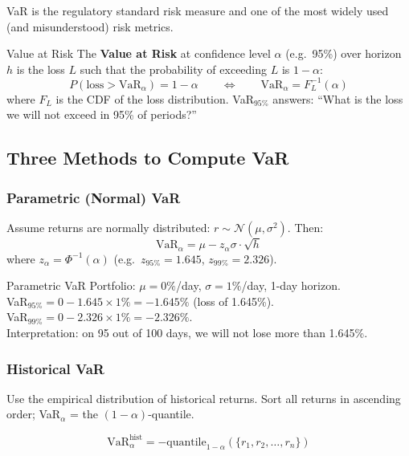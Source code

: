 \documentclass[12pt,a4paper,openany]{report}
\theoremstyle{definition}
\begin{document}
VaR is the regulatory standard risk measure and one of the most widely used (and misunderstood) risk metrics.

\begin{definitionbox}{Value at Risk}
The \textbf{Value at Risk} at confidence level $\alpha$ (e.g.\ 95\%) over horizon $h$ is the loss $L$ such that the probability of exceeding $L$ is $1-\alpha$:
\[
  P(\text{loss} > \text{VaR}_\alpha) = 1 - \alpha \qquad \Longleftrightarrow \qquad \text{VaR}_\alpha = F_L^{-1}(\alpha)
\]
where $F_L$ is the CDF of the loss distribution. VaR$_{95\%}$ answers: ``What is the loss we will not exceed in 95\% of periods?''
\end{definitionbox}

\subsection{Three Methods to Compute VaR}

\subsubsection{Parametric (Normal) VaR}

Assume returns are normally distributed: $r \sim \mathcal{N}(\mu, \sigma^2)$. Then:
\begin{equation}
  \text{VaR}_\alpha = \mu - z_\alpha \sigma \cdot \sqrt{h}
\end{equation}
where $z_\alpha = \Phi^{-1}(\alpha)$ (e.g.\ $z_{95\%} = 1.645$, $z_{99\%} = 2.326$).

\begin{examplebox}{Parametric VaR}
Portfolio: $\mu = 0\%$/day, $\sigma = 1\%$/day, 1-day horizon. \\
VaR$_{95\%} = 0 - 1.645 \times 1\% = -1.645\%$ (loss of 1.645\%). \\
VaR$_{99\%} = 0 - 2.326 \times 1\% = -2.326\%$. \\
Interpretation: on 95 out of 100 days, we will not lose more than 1.645\%.
\end{examplebox}

\subsubsection{Historical VaR}

Use the empirical distribution of historical returns. Sort all returns in ascending order; VaR$_\alpha$ = the $(1-\alpha)$-quantile.

\[
  \text{VaR}_\alpha^{\text{hist}} = -\text{quantile}_{1-\alpha}(\{r_1, r_2, \ldots, r_n\})
\]
\end{document}
